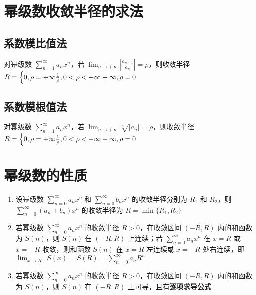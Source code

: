 \documentclass[lang = zh , final , oneside , openany , titlepage , zihao = -4 , linespread = 1.3 , baselineskip = false , cjk-font = windows , text-font = newtx , math-font = newtx]{sjtureport}
\begin{document}
\begin{definition}
\section{幂级数收敛半径的求法}

\subsection{系数模比值法}

\begin{theorem}
    对幂级数 \(\displaystyle \sum_{n=1}^\infty a_nx^n\)，若
\(\displaystyle \lim_{n\to+\infty}\left\vert\frac{a_{n+1}}{a_n}\right\vert = \rho\)，则收敛半径
\(\displaystyle R=\begin{cases}0,\rho=+\infty\newline  \frac{1}{\rho}, 0<\rho<+\infty\newline +\infty ,\rho=0\end{cases}\)
\end{theorem}

\subsection{系数模根值法}

\begin{theorem}
    对幂级数 \(\displaystyle \sum_{n=1}^\infty a_nx^n\)，若
\(\displaystyle \lim_{n\to+\infty}\sqrt[n]{\left\vert a_n\right\vert} = \rho\)，则收敛半径
\(\displaystyle R=\begin{cases}0,\rho=+\infty\newline  \frac{1}{\rho}, 0<\rho<+\infty\newline +\infty ,\rho=0\end{cases}\)
\end{theorem}

\section{幂级数的性质}

\begin{enumerate}
\item
  设幂级数 \(\displaystyle \sum_{n=0}^\infty a_nx^n\) 和
  \(\displaystyle \sum_{n=0}^\infty b_nx^n\) 的收敛半径分别为 \(R_1\) 和
  \(R_2\)，则 \(\displaystyle \sum_{n=0}^\infty (a_n+b_n)x^n\)
  的收敛半径为 \(R=\min\{R_1,R_2\}\)
\item
  若幂级数 \(\displaystyle \sum_{n=0}^\infty a_nx^n\) 的收敛半径
  \(R>0\)，在收敛区间 \((-R,R)\) 内的和函数为 \(S(n)\)，则 \(S(n)\) 在
  \((-R,R)\) 上连续；若 \(\displaystyle\sum_{n=0}^\infty a_nx^n\) 在
  \(x=R\) 或 \(x=-R\) 收敛，则和函数 \(S(n)\) 在 \(x=R\) 左连续或
  \(x=-R\) 处右连续，即
  \(\displaystyle \lim_{x\to R^-}S(x)=S(R)=\sum_{n=0}^\infty a_nR^n\)
\item
  若幂级数 \(\displaystyle \sum_{n=0}^\infty a_nx^n\) 的收敛半径
  \(R>0\)，在收敛区间 \((-R,R)\) 内的和函数为 \(S(n)\)，则 \(S(n)\) 在
  \((-R,R)\) 上可导，且有\textbf{逐项求导公式}
\end{enumerate}


\end{definition}
\end{document}
